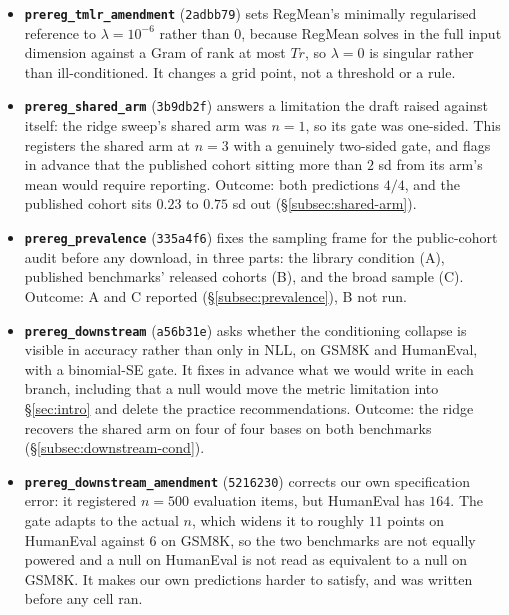 \begin{itemize}
\item \textbf{\texttt{prereg\_tmlr\_amendment}} (\texttt{2adbb79}) sets
RegMean's minimally regularised reference to $\lambda = 10^{-6}$ rather
than $0$, because RegMean solves in the full input dimension against a Gram
of rank at most $Tr$, so $\lambda = 0$ is singular rather than
ill-conditioned. It changes a grid point, not a threshold or a rule.

\item \textbf{\texttt{prereg\_shared\_arm}} (\texttt{3b9db2f}) answers a
limitation the draft raised against itself: the ridge sweep's shared arm
was $n = 1$, so its gate was one-sided. This registers the shared arm at
$n = 3$ with a genuinely two-sided gate, and flags in advance that the
published cohort sitting more than $2$ sd from its arm's mean would
require reporting. Outcome: both predictions $4/4$, and the published
cohort sits $0.23$ to $0.75$ sd out (\S\ref{subsec:shared-arm}).

\item \textbf{\texttt{prereg\_prevalence}} (\texttt{335a4f6}) fixes the
sampling frame for the public-cohort audit before any download, in three
parts: the library condition (A), published benchmarks' released cohorts
(B), and the broad sample (C). Outcome: A and C reported
(\S\ref{subsec:prevalence}), B not run.

\item \textbf{\texttt{prereg\_downstream}} (\texttt{a56b31e}) asks whether
the conditioning collapse is visible in accuracy rather than only in NLL,
on GSM8K and HumanEval, with a binomial-SE gate. It fixes in advance what
we would write in each branch, including that a null would move the metric
limitation into \S\ref{sec:intro} and delete the practice recommendations.
Outcome: the ridge recovers the shared arm on four of four bases on both
benchmarks (\S\ref{subsec:downstream-cond}).

\item \textbf{\texttt{prereg\_downstream\_amendment}} (\texttt{5216230})
corrects our own specification error: it registered $n = 500$ evaluation
items, but HumanEval has $164$. The gate adapts to the actual $n$, which
widens it to roughly $11$ points on HumanEval against $6$ on GSM8K, so the
two benchmarks are not equally powered and a null on HumanEval is not read
as equivalent to a null on GSM8K. It makes our own predictions harder to
satisfy, and was written before any cell ran.


\end{itemize}
